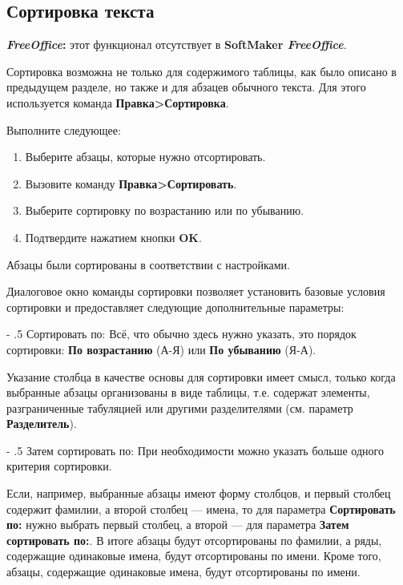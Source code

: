 \documentclass[a4paper,10pt]{article}
\makeatletter
\renewcommand\paragraph{%
   \@startsection{paragraph}{4}{0mm}%
      {-\baselineskip}%
      {.5\baselineskip}%
      {\normalfont\normalsize\bfseries}}
\makeatother
\begin{document}
\subsection{Сортировка текста}
\begin{mdframed}[backgroundcolor=pink!50]
\textbf{\textit{FreeOffice}:} этот функционал отсутствует в \textbf{SoftMaker \textit{FreeOffice}}.
\end{mdframed}

Сортировка возможна не только для содержимого таблицы, как было описано в предыдущем разделе, но также и для абзацев обычного текста. Для этого используется команда \textbf{Правка>Сортировка}.

Выполните следующее:
\begin{enumerate}
 \item Выберите абзацы, которые нужно отсортировать.
 \item Вызовите команду \textbf{Правка>Сортировать}.
 \item Выберите сортировку по возрастанию или по убыванию.
 \item Подтвердите нажатием кнопки \textbf{OK}.
\end{enumerate}

Абзацы были сортированы в соответствии с настройками.

Диалоговое окно команды сортировки позволяет установить базовые условия сортировки и предоставляет следующие дополнительные параметры:

\paragraph{Сортировать по:}
Всё, что обычно здесь нужно указать, это порядок сортировки: \textbf{По возрастанию} (А-Я) или \textbf{По убыванию} (Я-А).

Указание столбца в качестве основы для сортировки имеет смысл, только когда выбранные абзацы организованы в виде таблицы, т.е. содержат элементы, разграниченные табуляцией или другими разделителями (см. параметр \textbf{Разделитель}).

\paragraph{Затем сортировать по:}
При необходимости можно указать больше одного критерия сортировки.

Если, например, выбранные абзацы имеют форму столбцов, и первый столбец содержит фамилии, а второй столбец — имена, то для параметра \textbf{Сортировать по:} нужно выбрать первый столбец, а второй — для параметра \textbf{Затем сортировать по:}. В итоге абзацы будут отсортированы по фамилии, а ряды, содержащие одинаковые имена, будут отсортированы по имени. Кроме того, абзацы, содержащие одинаковые имена, будут отсортированы по имени.
\end{document}

